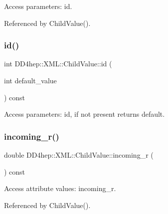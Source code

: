 Access parameters\+: id. 



Referenced by Child\+Value().

\hypertarget{struct_d_d4hep_1_1_x_m_l_1_1_child_value_aecc4c7b147564d52ce9715b83963ee69}{}\label{struct_d_d4hep_1_1_x_m_l_1_1_child_value_aecc4c7b147564d52ce9715b83963ee69} 
\subsubsection{\texorpdfstring{id()}{id()}\hspace{0.1cm}{\footnotesize\ttfamily [2/2]}}
{\footnotesize\ttfamily int D\+D4hep\+::\+X\+M\+L\+::\+Child\+Value\+::id (\begin{DoxyParamCaption}\item[{int}]{default\+\_\+value }\end{DoxyParamCaption}) const}



Access parameters\+: id, if not present returns default. 

\hypertarget{struct_d_d4hep_1_1_x_m_l_1_1_child_value_a12c21bbcabb9b6a07764a46fe1e73a3b}{}\label{struct_d_d4hep_1_1_x_m_l_1_1_child_value_a12c21bbcabb9b6a07764a46fe1e73a3b} 
\subsubsection{\texorpdfstring{incoming\+\_\+r()}{incoming\_r()}}
{\footnotesize\ttfamily double D\+D4hep\+::\+X\+M\+L\+::\+Child\+Value\+::incoming\+\_\+r (\begin{DoxyParamCaption}{ }\end{DoxyParamCaption}) const}



Access attribute values\+: incoming\+\_\+r. 



Referenced by Child\+Value().

\hypertarget{struct_d_d4hep_1_1_x_m_l_1_1_child_value_a62d60c9f68437075df585ee98bd459af}{}\label{struct_d_d4hep_1_1_x_m_l_1_1_child_value_a62d60c9f68437075df585ee98bd459af} 
